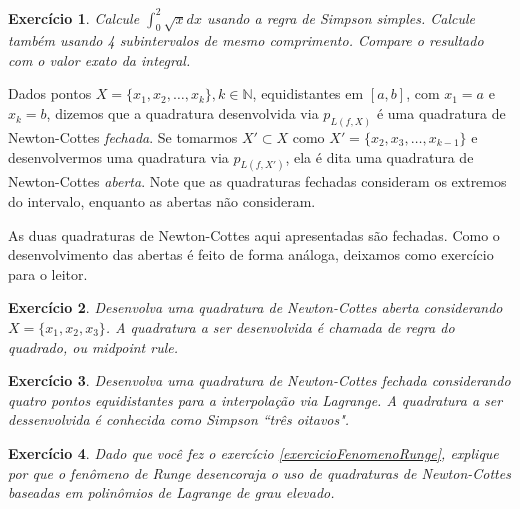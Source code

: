\documentclass[]{article}
\newtheorem{exercicio}{Exercício}
\numberwithin{equation}{section}
\begin{document}
\begin{exercicio}
  Calcule $\int_{0}^{2}\sqrt{x}dx$ usando a regra de Simpson
  simples. Calcule também usando 4 subintervalos de mesmo
  comprimento. Compare o resultado com o valor exato da integral.
\end{exercicio}

Dados pontos $X = \{x_1, x_2, \dots, x_k\}, k \in \mathbb{N}$,
equidistantes em $[a, b]$, com $x_1 = a$ e $x_k = b$, dizemos que a
quadratura desenvolvida via $p_{L(f, X)}$ é uma quadratura de
Newton-Cottes \emph{fechada}. Se tomarmos $X' \subset X$ como
$X' = \{x_2, x_3, \dots, x_{k - 1}\}$ e desenvolvermos uma quadratura
via $p_{L(f, X')}$, ela é dita uma quadratura de Newton-Cottes
\emph{aberta}. Note que as quadraturas fechadas consideram os extremos
do intervalo, enquanto as abertas não consideram.

As duas quadraturas de Newton-Cottes aqui apresentadas são
fechadas. Como o desenvolvimento das abertas é feito de forma análoga,
deixamos como exercício para o leitor.

\begin{exercicio}
  Desenvolva uma quadratura de Newton-Cottes aberta considerando
  $X = \{x_1, x_2, x_3\}$. A quadratura a ser desenvolvida é chamada
  de regra do quadrado, ou \emph{midpoint rule}.
\end{exercicio}

\begin{exercicio}
  Desenvolva uma quadratura de Newton-Cottes fechada considerando
  quatro pontos equidistantes para a interpolação via Lagrange. A
  quadratura a ser dessenvolvida é conhecida como Simpson ``três
  oitavos".
\end{exercicio}

\begin{exercicio}
  Dado que você fez o exercício \ref{exercicioFenomenoRunge}, explique
  por que o fenômeno de Runge desencoraja o uso de quadraturas de
  Newton-Cottes baseadas em polinômios de Lagrange de grau elevado.
\end{exercicio}
\end{document}
